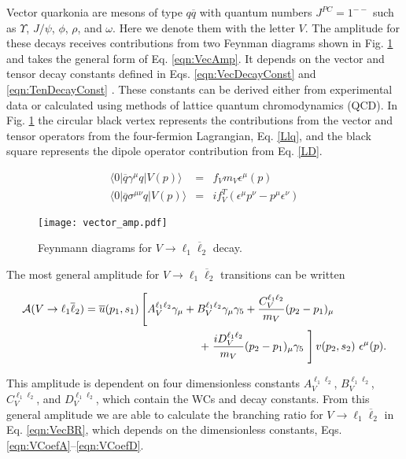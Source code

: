 \documentclass[12pt]{article}
\begin{document}
Vector quarkonia are mesons of type $q \overline{q}$ with quantum numbers $J^{PC}=1^{--}$ such as 
$\Upsilon$, $J/\psi$, $\phi$, $\rho$, and $\omega$.  Here we denote them with the letter $V$. The amplitude 
for these decays receives contributions from two Feynman diagrams shown in Fig. \ref{fig:VecAmp} and takes 
the general form of Eq. \ref{eqn:VecAmp}.  It depends on the vector and tensor decay constants defined in 
Eqs. \ref{eqn:VecDecayConst} and \ref{eqn:TenDecayConst} \cite{Becirevic:2013bsa}.  These constants can be derived either from 
experimental data or calculated using methods of lattice quantum chromodynamics (QCD).  In Fig. \ref{fig:VecAmp} the circular black vertex 
represents the contributions from the vector and tensor operators from the four-fermion Lagrangian, Eq. \ref{Llq}, 
and the black square represents the dipole operator contribution from Eq. \ref{LD}.

\begin{eqnarray}
\langle 0| \overline q \gamma^\mu q | V(p) \rangle &=& f_V m_V \epsilon^\mu (p) \label{eqn:VecDecayConst} \\
\langle 0| \overline q \sigma^{\mu\nu} q | V(p) \rangle &=& i f^T_V \left( \epsilon^\mu p^\nu-p^\mu \epsilon^\nu\right)
\label{eqn:TenDecayConst}
\end{eqnarray}

\begin{figure}[htbp]
    \centering
        \texttt{[image: vector\_amp.pdf]}
        \vspace{0cm}
    \caption{Feynmann diagrams for $V \to \ell_1 \overline \ell_2$ decay.}
    \label{fig:VecAmp}
\end{figure}

The most general amplitude for $V \to \ell_1 \overline{\ell}_2$ transitions can be written

\begin{eqnarray}\label{eqn:VecAmp}
{\cal A}(V\to \ell_1 \overline \ell_2) = \overline{u}(p_1, s_1) \left[
A_V^{\ell_1\ell_2} \gamma_\mu + B_V^{\ell_1\ell_2} \gamma_\mu \gamma_5 
+ \frac{C_V^{\ell_1\ell_2}}{m_{V}} (p_2-p_1)_\mu 
\right. ~~~~~~~~~~~~~~
\nonumber \\
\qquad + \left.
\frac{iD_V^{\ell_1\ell_2}}{m_{V} }(p_2-p_1)_\mu \gamma_5 \
\right] v(p_2,s_2) \ \epsilon^\mu(p) \text{.}
\end{eqnarray}

This amplitude is dependent on four dimensionless constants $A_V^{\ell_1\ell_2}$, $B_V^{\ell_1\ell_2}$, 
$C_V^{\ell_1\ell_2}$, and $D_V^{\ell_1\ell_2}$, which contain the WCs and decay constants.  From 
this general amplitude we are able to calculate the branching ratio for $V \to \ell_1 \overline \ell_2$ in 
Eq. \ref{eqn:VecBR}, which depends on the dimensionless constants, Eqs.  \ref{eqn:VCoefA}--\ref{eqn:VCoefD}.
\end{document}
